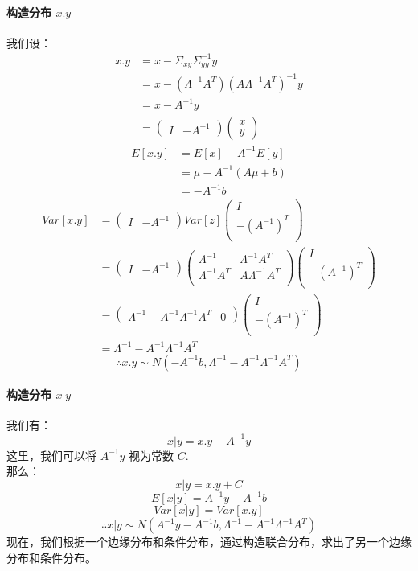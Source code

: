 \documentclass{report}
\begin{document}
\paragraph{构造分布 $x.y$\\}
我们设：
$$
\begin{aligned}
x.y 
&= x - \Sigma_{xy} \Sigma_{yy}^{-1}y\\
&= x - (\Lambda^{-1} A^T)(A \Lambda^{-1}A^T)^{-1}y\\
&= x - A^{-1}y\\
&= 
\left ( \begin{matrix}
I& -A^{-1}
\end{matrix} \right )
\left ( \begin{matrix}
x\\
y
\end{matrix} \right )
\end{aligned}
$$
$$
\begin{aligned}
E[x.y] 
&= E[x] - A^{-1} E[y]\\
&= \mu - A^{-1}(A\mu+b)\\
&= -A^{-1}b
\end{aligned}
$$
$$
\begin{aligned}
Var[x.y]
&= 
\left ( \begin{matrix}
I& -A^{-1}
\end{matrix} \right )
Var[z]
\left ( \begin{matrix}
I\\
-(A^{-1})^T\\
\end{matrix} \right )\\
&= 
\left ( \begin{matrix}
I& -A^{-1}
\end{matrix} \right )
\left (
\begin{matrix}
\Lambda^{-1}&\Lambda^{-1}A^T\\
\Lambda^{-1}A^T&A\Lambda^{-1} A^T\\
\end{matrix}
\right )
\left ( \begin{matrix}
I\\
-(A^{-1})^T\\
\end{matrix} \right )\\
&=
\left ( \begin{matrix}
\Lambda^{-1}-A^{-1} \Lambda^{-1}A^T & 0
\end{matrix} \right )
\left ( \begin{matrix}
I\\
-(A^{-1})^T\\
\end{matrix} \right )\\
&=\Lambda^{-1}-A^{-1} \Lambda^{-1}A^T
\end{aligned}
$$
$$
\therefore x.y \sim N(-A^{-1}b, \Lambda^{-1}-A^{-1} \Lambda^{-1}A^T)
$$
\paragraph{构造分布 $x|y$\\}
我们有：
$$
x|y = x.y + A^{-1}y
$$
这里，我们可以将 $A^{-1}y$ 视为常数 $C$.\\
那么：
$$
x|y = x.y + C
$$
$$
E[x|y] = A^{-1}y - A^{-1}b
$$
$$
Var[x|y]= Var[x.y]
$$
$$
\therefore x|y \sim N(A^{-1}y - A^{-1}b, \Lambda^{-1}-A^{-1} \Lambda^{-1}A^T)
$$
现在，我们根据一个边缘分布和条件分布，通过构造联合分布，求出了另一个边缘分布和条件分布。
\end{document}
